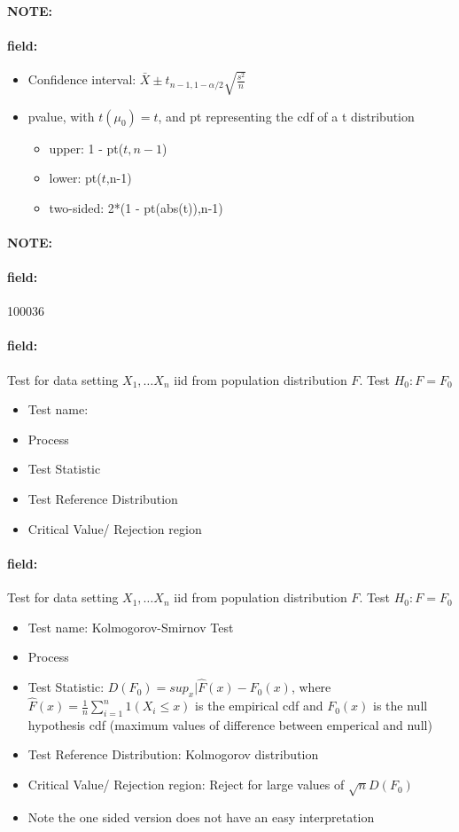 \documentclass[12pt]{article}
\newenvironment{note}{\paragraph{NOTE:}}{}
\newenvironment{field}{\paragraph{field:}}{}
\begin{document}
\begin{note}
\begin{field}
\begin{itemize}
\begin{itemize}
         \end{itemize}
   \item Confidence interval: $\bar{X} \pm t_{n-1,1-\alpha/2}\sqrt{\frac{s^2}{n}}$
   \item pvalue, with $t(\mu_0)  = t$, and pt representing the cdf of a t distribution
         \begin{itemize}
          \item upper: 1 - pt($t,n-1$)
          \item lower: pt($t$,n-1)
          \item two-sided: 2*(1 - pt(abs(t)),n-1)
         \end{itemize}
  \end{itemize}
 \end{field}
\end{note}

\begin{note} \begin{field} \tiny 100036 \end{field}
 \begin{field}
  Test for data setting $X_1, \ldots X_n$ iid from population distribution $F$. Test $H_0: F = F_0$
  \begin{itemize}
   \item Test name:
   \item Process
   \item Test Statistic
   \item Test Reference Distribution
   \item Critical Value/ Rejection region
  \end{itemize}
 \end{field}
 \begin{field}
  Test for data setting $X_1, \ldots X_n$ iid from population distribution $F$. Test $H_0: F = F_0$
  \begin{itemize}
   \item Test name: Kolmogorov-Smirnov Test
   \item Process
   \item Test Statistic: $D(F_0) = sup_x|\hat{F}(x) - F_0(x)$, where $\hat{F}(x) = \frac{1}{n}\sum_{i=1}^n 1(X_i \leq x)$ is the empirical cdf and $F_0(x)$ is the null hypothesis cdf (maximum values of difference between emperical and null)
   \item Test Reference Distribution: Kolmogorov distribution
   \item Critical Value/ Rejection region: Reject for large values of $\sqrt{n}D(F_0)$
   \item Note the one sided version does not have an easy interpretation
  \end{itemize}
 \end{field}
\end{note}
\end{document}
